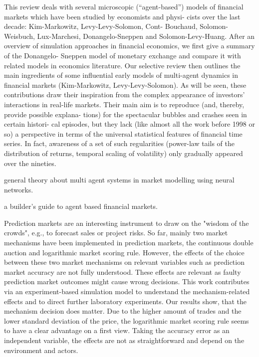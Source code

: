 
\cite{Bundesbank2007} This review deals with several microscopic (“agent-based”) models
of financial markets which have been studied by economists and physi- cists over
the last decade: Kim-Markowitz, Levy-Levy-Solomon, Cont- Bouchaud,
Solomon-Weisbuch, Lux-Marchesi, Donangelo-Sneppen and Solomon-Levy-Huang. After
an overview of simulation approaches in financial economics, we first give a
summary of the Donangelo- Sneppen model of monetary exchange and compare it with
related models in economics literature. Our selective review then outlines the
main ingredients of some influential early models of multi-agent dynamics in
financial markets (Kim-Markowitz, Levy-Levy-Solomon). As will be seen, these
contributions draw their inspiration from the complex appearance of investors’
interactions in real-life markets. Their main aim is to reproduce (and, thereby,
provide possible explana- tions) for the spectacular bubbles and crashes seen in
certain histori- cal episodes, but they lack (like almost all the work before
1998 or so) a perspective in terms of the universal statistical features of
financial time series. In fact, awareness of a set of such regularities
(power-law tails of the distribution of returns, temporal scaling of volatility)
only gradually appeared over the nineties.

\cite{Grothmann2002} general theory about multi agent systems in market
modelling using neural networks.

\cite{Lebaron2001} a builder's guide to agent based financial markets.

\cite{Klingert2017} Prediction markets are an interesting instrument to draw on
the "wisdom of the crowds", e.g., to forecast sales or project risks. So far,
mainly two market mechanisms have been implemented in prediction markets, the
continuous double auction and logarithmic market scoring rule. However, the
effects of the choice between these two market mechanisms on relevant variables
such as prediction market accuracy are not fully understood. These effects are
relevant as faulty prediction market outcomes might cause wrong decisions. This
work contributes via an experiment-based simulation model to understand the
mechanism-related effects and to direct further laboratory experiments. Our
results show, that the mechanism decision does matter. Due to the higher amount
of trades and the lower standard deviation of the price, the logarithmic market
scoring rule seems to have a clear advantage on a first view. Taking the
accuracy error as an independent variable, the effects are not as
straightforward and depend on the environment and actors.

